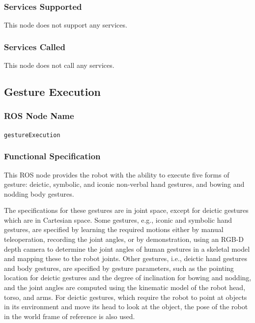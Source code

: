\documentclass{CSSRforAfrica}
\begin{document}
{\subsubsection*{Services Supported}
This node  does not support any services.

\subsubsection*{Services Called}
This node does not call any services.






 
\newpage

\subsection{Gesture Execution }

\subsubsection*{ROS Node Name}
 {\small \verb+gestureExecution+}   

\subsubsection*{Functional Specification}
This ROS node  provides the robot with the ability to execute five forms of gesture: deictic, symbolic, and iconic non-verbal hand gestures, and bowing and nodding body gestures. 
 
The specifications for these gestures are in joint space, except for deictic gestures which are  in Cartesian space.  Some gestures, e.g., iconic and symbolic hand gestures, are specified by learning the required motions either by manual teleoperation, recording the joint angles, or by demonstration,  using an RGB-D depth camera to determine the joint angles of human gestures in a skeletal model  and mapping  these to the robot joints. Other gestures, i.e., deictic hand gestures and body gestures, are specified by gesture parameters, such as the pointing location for deictic gestures and the degree of inclination for bowing and nodding, and the joint angles are computed using the kinematic model of the robot head, torso, and arms. For deictic gestures, which require the robot to point at objects in its environment and move its head to look at the object, the pose of the robot in the world frame of reference is also used.
 
}
\end{document}
